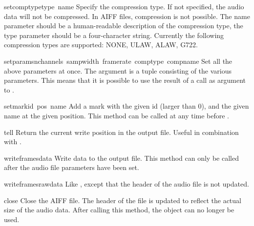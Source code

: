 \begin{funcdesc}{setcomptype}{type\, name}
Specify the compression type.  If not specified, the audio data will
not be compressed.  In AIFF files, compression is not possible.  The
name parameter should be a human-readable description of the
compression type, the type parameter should be a four-character
string.  Currently the following compression types are supported:
NONE, ULAW, ALAW, G722.
\end{funcdesc}

\begin{funcdesc}{setparams}{nchannels\, sampwidth\, framerate\, comptype\, compname}
Set all the above parameters at once.  The argument is a tuple
consisting of the various parameters.  This means that it is possible
to use the result of a  call as argument to
.
\end{funcdesc}

\begin{funcdesc}{setmark}{id\, pos\, name}
Add a mark with the given id (larger than 0), and the given name at
the given position.  This method can be called at any time before
.
\end{funcdesc}

\begin{funcdesc}{tell}{}
Return the current write position in the output file.  Useful in
combination with .
\end{funcdesc}

\begin{funcdesc}{writeframes}{data}
Write data to the output file.  This method can only be called after
the audio file parameters have been set.
\end{funcdesc}

\begin{funcdesc}{writeframesraw}{data}
Like , except that the header of the audio file is
not updated.
\end{funcdesc}

\begin{funcdesc}{close}{}
Close the AIFF file.  The header of the file is updated to reflect the
actual size of the audio data. After calling this method, the object
can no longer be used.
\end{funcdesc}
